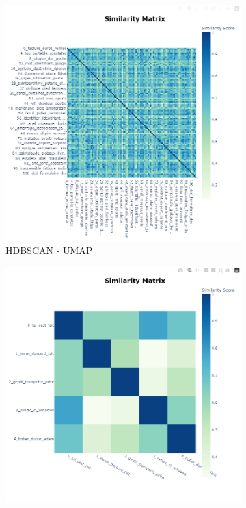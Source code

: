 \begin{figure}[H]
    \centering
    \begin{subfigure}{0.45\textwidth}
        \includegraphics[width=\linewidth]{images/results/mini/hdbscan-umap.png}
        \caption{HDBSCAN - UMAP}
    \end{subfigure}
    \begin{subfigure}{0.45\textwidth}
        \includegraphics[width=\linewidth]{images/results/mini/hdbscan-pca.png}

\end{subfigure}
\end{figure}
